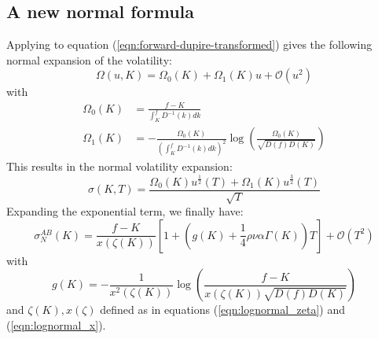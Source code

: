 \documentclass[]{rAMF2e}
\begin{document}
\subsection{A new normal formula}
Applying \citet[proposition B.2]{andersen2005extended} to equation (\ref{eqn:forward-dupire-transformed}) gives the following normal expansion of the volatility:
\begin{equation}
\Omega(u, K) = \Omega_0(K) + \Omega_1(K) u + \mathcal{O}(u^2)
\end{equation}
with 
\begin{align}
\Omega_0(K) &= \frac{f-K}{\int_K^f D^{-1}(k)dk} \\
\Omega_1(K) &= - \frac{\Omega_0(K)}{\left(\int_K^f D^{-1}(k)dk\right)^2}\log\left(\frac{\Omega_0(K)}{\sqrt{D(f)D(K)}}\right)
\end{align}
This results in the normal volatility expansion:
\begin{equation}
\sigma(K,T) = \frac{\Omega_0(K) u^{\frac{1}{2}}(T) + \Omega_1(K) u^{\frac{3}{2}}(T)}{\sqrt{T}}
\end{equation}
Expanding the exponential term, we finally have:
\begin{equation}\label{eqn:normal_ab}
\sigma_N^{AB}(K) =  \frac{f-K}{x(\zeta(K))}\left[1+ \left(g(K)+\frac{1}{4}\rho\nu\alpha\Gamma(K) \right)T\right]+ \mathcal{O}(T^2)
\end{equation}
with 
\begin{equation*}
g(K) = - \frac{1}{x^2(\zeta(K))}\log\left(\frac{f-K}{x(\zeta(K))\sqrt{D(f)D(K)}}\right)
\end{equation*}
 and $\zeta(K), x(\zeta)$ defined as in equations (\ref{eqn:lognormal_zeta}) and (\ref{eqn:lognormal_x}).
\end{document}
